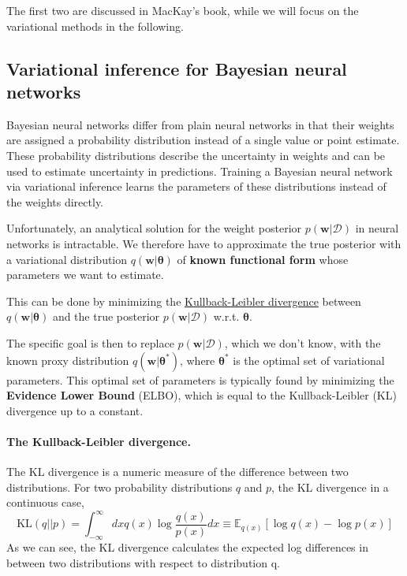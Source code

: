 \documentclass[%
oneside,                 %
final,                   %
10pt]{article}
\begin{document}
\noindent
The first two are discussed in MacKay's book, while we will focus on the variational methods in the following.

\subsection{Variational inference for Bayesian neural networks}

Bayesian neural networks differ from plain neural networks in that their weights are assigned a probability distribution instead of a single value or point estimate. These probability distributions describe the uncertainty in weights and can be used to estimate uncertainty in predictions. Training a Bayesian neural network via variational inference learns the parameters of these distributions instead of the weights directly.

Unfortunately, an analytical solution for the weight posterior $p(\mathbf{w} \lvert \mathcal{D})$ in neural networks is intractable. We therefore have to approximate the true posterior with a variational distribution $q(\mathbf{w} \lvert \boldsymbol{\theta})$ of \textbf{known functional form} whose parameters we want to estimate. 

This can be done by minimizing the \href{{https://en.wikipedia.org/wiki/Kullback%E2%80%93Leibler_divergence}}{Kullback-Leibler divergence} between $q(\mathbf{w} \lvert \boldsymbol{\theta})$ and the true posterior $p(\mathbf{w} \lvert \mathcal{D})$  w.r.t. $\boldsymbol{\theta}$.

The specific goal is then to replace $p(\mathbf{w} \lvert \mathcal{D})$, which we don't know, with the known proxy distribution $q(\mathbf{w} \lvert \boldsymbol{\theta}^*)$, where $\boldsymbol{\theta}^*$ is the optimal set of variational parameters. This optimal set of parameters is typically found by minimizing the \textbf{Evidence Lower Bound} (ELBO), which is equal to the Kullback-Leibler (KL) divergence up to a constant.

\paragraph{The Kullback-Leibler divergence.}
The KL divergence is a numeric measure of the difference between two distributions. For two probability distributions $q$ and $p$, the KL divergence in a continuous case,
\[ \mathrm{KL}(q||p) = \int_{-\infty}^\infty dx q(x) \log \frac{q(x)}{p(x)} dx \equiv \mathbb{E}_{q(x)} \left[ \log q(x) - \log p(x) \right] \]
As we can see, the KL divergence calculates the expected log differences in between two distributions with respect to distribution q.
\end{document}
